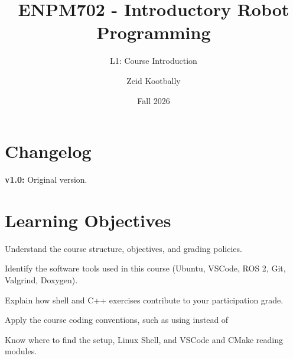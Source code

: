 \documentclass[
    10pt,
    dvipsnames,
    svgnames,
    x11names,
    aspectratio=1610,
    english,
    codeminted]{beamer}
\title{ENPM702 - Introductory Robot Programming}
\author[Z.~Kootbally]{Zeid Kootbally}
\subtitle{\textcolor{MarylandYellow!50}{L1}: Course Introduction}
\institute[UMD]{University of Maryland\\College Park}
\date{Fall 2026}
\begin{document}

{
  \begin{frame}\titlepage\end{frame}}

{
\scriptsize
\hypertarget{toc}{}
\sepframe[title={Table of Contents}]
}

\section*{Changelog}
\begingroup
{}
\begin{frame}
  \secdivheader{\secname}
  
\begin{compactitem}
    \item \textbf{v1.0:} Original version.
\end{compactitem}
\end{frame}
\endgroup



\section*{Learning Objectives}
\begingroup
{}
\begin{frame}
  \secdivheader{\secname}

\begin{compactitem}
    \item Understand the course structure, objectives, and grading policies.
    \item Identify the software tools used in this course (Ubuntu, VSCode, ROS 2, Git, Valgrind, Doxygen).
    \item Explain how shell and C++ exercises contribute to your participation grade.
    \item Apply the course coding conventions, such as using  instead of 
    \item Know where to find the setup, Linux Shell, and VSCode and CMake reading modules.
\end{compactitem}
\end{frame}
\endgroup
\end{document}
